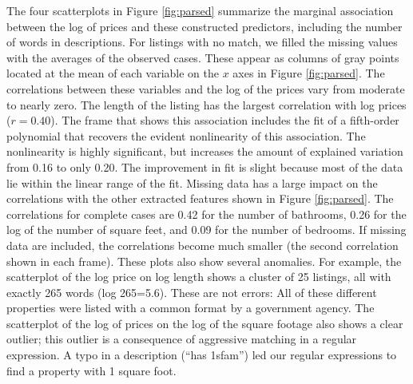 \documentclass[12pt]{article}
\begin{document}
 The four scatterplots in Figure \ref{fig:parsed} summarize the marginal
 association between the log of prices and these constructed predictors,
 including the number of words in descriptions.  For listings with no match, we
 filled the missing values with the averages of the observed cases.  These
 appear as columns of gray points located at the mean of each variable on the
 $x$ axes in Figure \ref{fig:parsed}.  The correlations between these variables
 and the log of the prices vary from moderate to nearly zero.  The length of the
 listing has the largest correlation with log prices ($r=0.40$). The frame that
 shows this association includes the fit of a fifth-order polynomial that
 recovers the evident nonlinearity of this association.  The nonlinearity is
 highly significant, but increases the amount of explained variation from 0.16
 to only 0.20.  The improvement in fit is slight because most of the data lie
 within the linear range of the fit.  Missing data has a large impact on the
 correlations with the other extracted features shown in Figure
 \ref{fig:parsed}.  The correlations for complete cases are 0.42 for the number
 of bathrooms, 0.26 for the log of the number of square feet, and 0.09 for the
 number of bedrooms.  If missing data are included, the correlations become much
 smaller (the second correlation shown in each frame).  These plots also show
 several anomalies.  For example, the scatterplot of the log price on log length
 shows a cluster of 25 listings, all with exactly 265 words (log 265=5.6).
  These are not errors: All of these different properties were listed with a
 common format by a government agency.  The scatterplot of the log of prices on
 the log of the square footage also shows a clear outlier; this outlier is a
 consequence of aggressive matching in a regular expression.  A typo in a
 description (``has 1sfam'') led our regular expressions to find a property with
 1 square foot.
\end{document}

